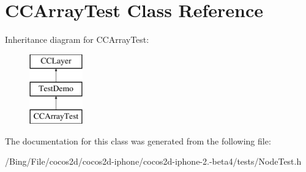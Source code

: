 \hypertarget{interface_c_c_array_test}{\section{C\-C\-Array\-Test Class Reference}
\label{interface_c_c_array_test}
}
Inheritance diagram for C\-C\-Array\-Test\-:\begin{figure}[H]
\begin{center}
\leavevmode
\includegraphics[height=3.000000cm]{interface_c_c_array_test}
\end{center}
\end{figure}


The documentation for this class was generated from the following file\-:\begin{DoxyCompactItemize}
\item 
/\-Bing/\-File/cocos2d/cocos2d-\/iphone/cocos2d-\/iphone-\/2.-\/beta4/tests/Node\-Test.\-h\end{DoxyCompactItemize}
